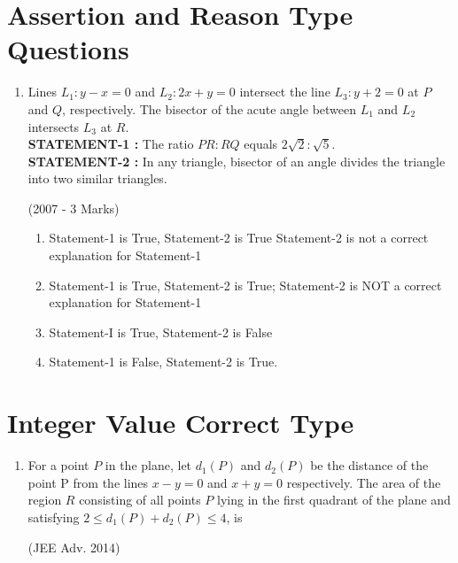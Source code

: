 \documentclass[journal,12pt,twocolumn]{IEEEtran}
\theoremstyle{remark}
\begin{document}
\section{Assertion and Reason Type Questions} 
\begin{enumerate}
\item Lines $L_{1}: y-x=0$ and $L_{2}: 2x+y=0$ intersect the line $L_{3}: y+2=0$ at $P$ and $Q$, respectively. The bisector of the acute 
angle between $L_{1}$ and $L_{2}$ intersects $L_{3}$ at $R$.\\
\textbf{STATEMENT-1 :} The ratio $PR:RQ$ equals $2\sqrt{2}:\sqrt{5}$.\\
\textbf{STATEMENT-2 :} In any triangle, bisector of an angle divides the triangle into two similar triangles.

\hfill{(2007 - 3 Marks)}
   \begin{enumerate}
   \item Statement-1 is True, Statement-2 is True Statement-2 
is not a correct explanation for Statement-1 
   \item Statement-1 is True, Statement-2 is True; Statement-2 
is NOT a correct explanation for Statement-1 
   \item Statement-I is True, Statement-2 is False
   \item Statement-1 is False, Statement-2 is True. 
   \end{enumerate}
\end{enumerate}

\section{Integer Value Correct Type}
\begin{enumerate}
\item For a point $P$ in the plane, let $d_{1}(P)$ and $d_{2}(P)$ be the 
distance of the point P from the lines $x-y=0$ and $x+y =0$ 
respectively. The area of the region $R$ consisting of all points 
$P$ lying in the first quadrant of the plane and satisfying
$2\leq d_{1}(P)+d_{2}(P) \leq4$, is

		\hfill{(JEE Adv. 2014)}
\end{enumerate}
\end{document}
